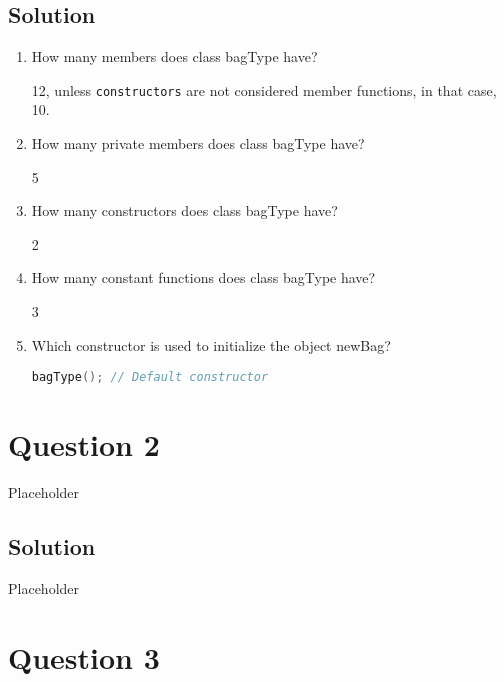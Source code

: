 \documentclass[a4paper, 10pt]{article}
\begin{document}
    \subsection{Solution}
      \begin{enumerate}[label=\alph*.]
          \item How many members does class bagType have?%
            \begin{mdframed}[backgroundcolor=green!20]
              12, unless \texttt{constructors} are not considered member functions,
                in that case, 10.
            \end{mdframed}
          \item How many private members does class bagType have?%
            \begin{mdframed}[backgroundcolor=green!20]
              5
            \end{mdframed}
          \item How many constructors does class bagType have?%
            \begin{mdframed}[backgroundcolor=green!20]
              2
            \end{mdframed}
          \item How many constant functions does class bagType have?%
            \begin{mdframed}[backgroundcolor=green!20]
              3
            \end{mdframed}
          \item Which constructor is used to initialize the object newBag?%
            \begin{mdframed}[backgroundcolor=green!20]
              \lstinline[language=c++,columns=fixed]%
                {bagType(); // Default constructor}
            \end{mdframed}
      \end{enumerate}


  \newpage
  % Question 2
  \section{Question 2}
    Placeholder
    \subsection{Solution}
      Placeholder

  \section{Question 3}
\end{document}
